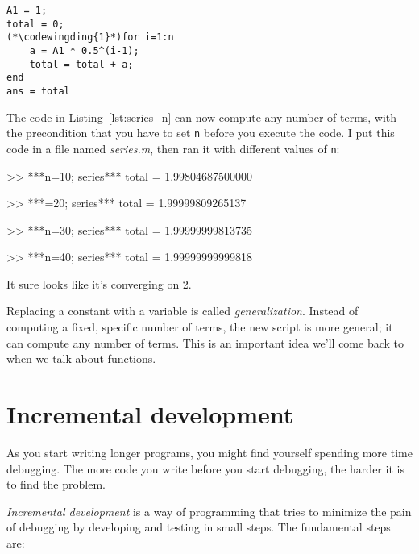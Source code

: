 \begin{lstlisting}[caption={Updating our code from Listing 1-1 to have a variable number of terms}, label={lst:series_n}]
A1 = 1;
total = 0;
(*\codewingding{1}*)for i=1:n
    a = A1 * 0.5^(i-1);
    total = total + a;
end
ans = total
\end{lstlisting}

The code in Listing~\ref{lst:series_n} can now compute any number of terms, with the
precondition that you have to set {\tt n} before you execute
the code.  
I put this code in a file named {\em series.m}, then
ran it with different values of {\tt n}:

\begin{code}
>> ***n=10; series***
total = 1.99804687500000

>> ***=20; series***
total = 1.99999809265137

>> ***n=30; series***
total = 1.99999999813735

>> ***n=40; series***
total = 1.99999999999818
\end{code}

It sure looks like it's converging on 2.

Replacing a constant with a variable is called \emph{generalization}.
Instead of computing a fixed, specific number of terms, the new script
is more general; it can compute any number of terms.
This is an important idea we'll come back to when we talk about functions.

\section{Incremental development}


As you start writing longer programs, you might find yourself spending more time debugging.
The more code you write before you start debugging, the harder it is to find
the problem.

\emph{Incremental development} is a way of programming that tries
to minimize the pain of debugging by developing and testing in small steps.  The fundamental steps are:

